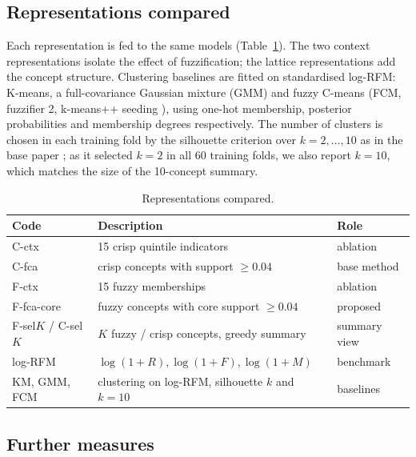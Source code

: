 \subsection{Representations compared}\label{sec:methods}

Each representation is fed to the same models (Table~\ref{tab:methods}). The two context representations isolate the effect of fuzzification; the lattice representations add the concept structure. Clustering baselines are fitted on standardised log-RFM: K-means, a full-covariance Gaussian mixture (GMM) and fuzzy C-means (FCM, fuzzifier 2, k-means++ seeding \citep{arthur2007,bezdek1981}), using one-hot membership, posterior probabilities and membership degrees respectively. The number of clusters is chosen in each training fold by the silhouette criterion over $k = 2,\dots,10$ as in the base paper \citep{rousseeuw1987}; as it selected $k = 2$ in all 60 training folds, we also report $k = 10$, which matches the size of the 10-concept summary.

\begin{table}[t]
\centering\small
\caption{Representations compared.}
\label{tab:methods}
\begin{tabular}{lll}
\toprule
Code & Description & Role \\
\midrule
C-ctx & 15 crisp quintile indicators & ablation \\
C-fca & crisp concepts with support $\ge 0.04$ \citep{rungruang2024} & base method \\
F-ctx & 15 fuzzy memberships & ablation \\
F-fca-core & fuzzy concepts with core support $\ge 0.04$ & proposed \\
F-sel$K$ / C-sel$K$ & $K$ fuzzy / crisp concepts, greedy summary & summary view \\
log-RFM & $\log(1+R), \log(1+F), \log(1+M)$ & benchmark \\
KM, GMM, FCM & clustering on log-RFM, silhouette $k$ and $k=10$ & baselines \\
\bottomrule
\end{tabular}
\end{table}

\subsection{Further measures}\label{sec:measures}

